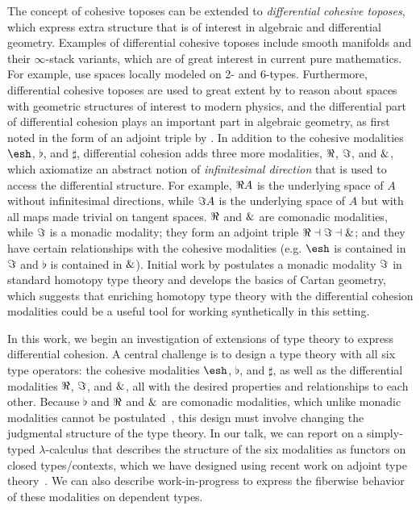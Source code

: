 \documentclass{article}
\begin{document}
{The concept of cohesive toposes can be extended to \emph{differential
  cohesive toposes}, which express extra structure that is of interest
in algebraic and differential geometry.  Examples of differential
cohesive toposes include smooth manifolds and their $\infty$-stack
variants, which are of great interest in current pure mathematics. For
example, \citet{SatiSchreiberStasheff2012} use spaces locally modeled
on 2- and 6-types.  Furthermore, differential cohesive toposes are used
to great extent by \citet{Schreiber2013} to reason about spaces with
geometric structures of interest to modern physics, and the differential
part of differential cohesion plays an important part in algebraic
geometry, as first noted in the form of an adjoint triple by
\citet{SimpsonTeleman}.  In addition to the cohesive modalities
$\shape$, $\flat$, and $\sharp$, differential cohesion adds three more
modalities, $\Re$, $\Im$, and $\&$, which axiomatize an abstract
notion of \emph{infinitesimal direction} that is used to access the
differential structure.  For example, $\Re A$ is the underlying space
of $A$ without infinitesimal directions, while $\Im A$ is the
underlying space of $A$ but with all maps made trivial on tangent
spaces.  $\Re$ and $\&$ are comonadic modalities, while $\Im$ is a
monadic modality; they form an adjoint triple $\Re \dashv \Im \dashv
\&$; and they have certain relationships with the cohesive modalities
(e.g. $\shape$ is contained in $\Im$ and $\flat$ is contained in
$\&$).  Initial work by \citet{Wellen2017} postulates a monadic
modality $\Im$ in standard homotopy type theory and develops the
basics of Cartan geometry, which suggests that enriching homotopy type
theory with the differential cohesion modalities could be a useful tool
for working synthetically in this setting.
 

In this work, we begin an investigation of extensions of type theory to
express differential cohesion.  A central challenge is to design a type
theory with all six type operators: the cohesive modalities $\shape$,
$\flat$, and $\sharp$, as well as the differential modalities $\Re$,
$\Im$, and $\&$, all with the desired properties and relationships
to each other.  Because $\flat$ and $\Re$ and $\&$ are comonadic
modalities, which unlike monadic modalities cannot be
postulated~\citep{Shulman2015}, this design must involve changing the
judgmental structure of the type theory.  In our talk, we can report on a
simply-typed $\lambda$-calculus that describes the structure of the six
modalities as functors on closed types/contexts, which we have designed
using recent work on adjoint type theory~\citep{Licata2017}.  We can
also describe work-in-progress to express the fiberwise behavior of
these modalities on dependent types.

}
\end{document}
